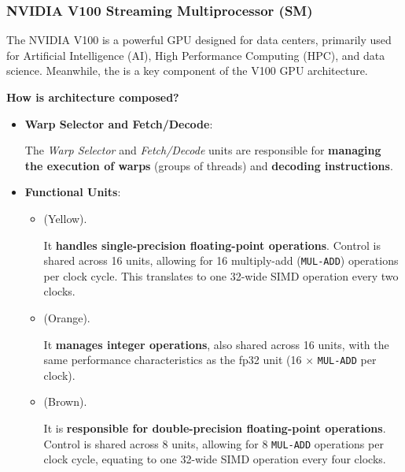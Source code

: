 \subsubsection{NVIDIA V100 Streaming Multiprocessor (SM)}

The NVIDIA V100 is a powerful GPU designed for data centers, primarily used for Artificial Intelligence (AI), High Performance Computing (HPC), and data science. Meanwhile, the  is a key component of the V100 GPU architecture.

\highspace
\begin{flushleft}
    \textcolor{Green3}{ \textbf{How is architecture composed?}}
\end{flushleft}
\begin{itemize}
    \item \textbf{Warp Selector and Fetch/Decode}:
    
    The \emph{Warp Selector} and \emph{Fetch/Decode} units are responsible for \textbf{managing the execution of warps} (groups of threads) and \textbf{decoding instructions}.


    \item \textbf{Functional Units}:
    \begin{itemize}
        \item {} (Yellow).
        
        It \textbf{handles single-precision floating-point operations}. Control is shared across 16 units, allowing for 16 multiply-add (\texttt{MUL-ADD}) operations per clock cycle. This translates to one 32-wide SIMD operation every two clocks.


        \item {} (Orange). 
        
        It \textbf{manages integer operations}, also shared across 16 units, with the same performance characteristics as the fp32 unit (16 $\times$ \texttt{MUL-ADD} per clock).
        

        \item {} (Brown). 
        
        It is \textbf{responsible for double-precision floating-point operations}. Control is shared across 8 units, allowing for 8 \texttt{MUL-ADD} operations per clock cycle, equating to one 32-wide SIMD operation every four clocks.
        


\end{itemize}
\end{itemize}
